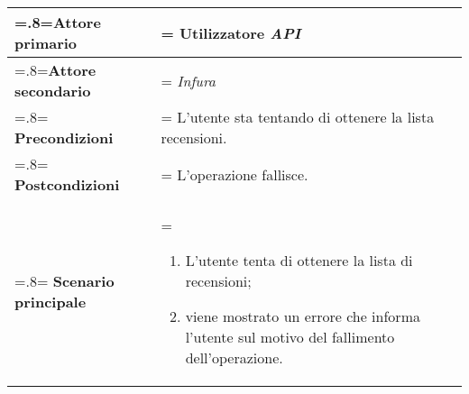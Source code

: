             \begin{center}
                \renewcommand{\arraystretch}{1.5}
                \renewcommand\tabularxcolumn[1]{m{#1}}
                \begin{tabularx}{0.9\textwidth} {
                    >{\hsize=.8\hsize\linewidth=\hsize}X
                    >{\hsize=1.2\hsize\linewidth=\hsize}X}
                    \hline
                    \textbf{Attore primario} & Utilizzatore \textit{API} \\
                    \hline
                    \textbf{Attore secondario} & \textit{Infura} \\
                    \hline
                    \textbf{Precondizioni} & L'utente sta tentando di ottenere la lista recensioni. \\
                    \hline
                    \textbf{Postcondizioni} & L'operazione fallisce. \\
                    \hline
                    \textbf{Scenario principale} &
                        \begin{enumerate}
                            \item L'utente tenta di ottenere la lista di recensioni;
                            \item viene mostrato un errore che informa l'utente sul motivo del fallimento
                            dell'operazione.
                        \end{enumerate} \\
                    \hline
                \end{tabularx}
            \end{center}

\pagebreak